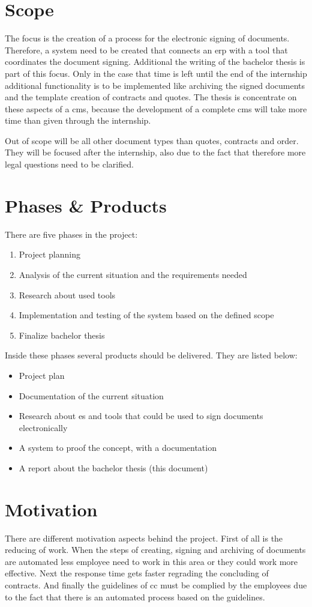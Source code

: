  \section{Scope}
 The focus is the creation of a process for the electronic signing of documents. Therefore, a system need to be created that connects an \gls{erp} with a tool that coordinates the document signing. Additional the writing of the bachelor thesis is part of this focus. Only in the case that time is left until the end of the internship additional functionality is to be implemented like archiving the signed documents and the template creation of contracts and quotes. The thesis is concentrate on these aspects of a \gls{cms}, because the development of a complete \gls{cms} will take more time than given through the internship. 
 
 Out of scope will be all other document types than quotes, contracts and order. They will be focused after the internship, also due to the fact that therefore more legal questions need to be clarified. 
 
 \section{Phases \& Products} \label{sec:phases}
 There are five phases in the project:
 \begin{enumerate}
 	\item Project planning
 	\item Analysis of the current situation and the requirements needed
 	\item Research about used tools 
 	\item Implementation and testing of the system based on the defined scope
 	\item Finalize bachelor thesis
 \end{enumerate}
 
 Inside these phases several products should be delivered. They are listed below:
 \begin{itemize}
 	\item Project plan
 	\item Documentation of the current situation
 	\item Research about \gls{es} and tools that could be used to sign documents electronically
 	\item A system to proof the concept, with a documentation
 	\item A report about the bachelor thesis (this document)
 \end{itemize}
 
 \section{Motivation}
 There are different motivation aspects behind the project. First of all is the reducing of work. When the steps of creating, signing and archiving of documents are automated less employee need to work in this area or they could work more effective. Next the response time gets faster regrading the concluding of contracts. And finally the guidelines of \gls{cc} must be complied by the employees due to the fact that there is an automated process based on the guidelines. 